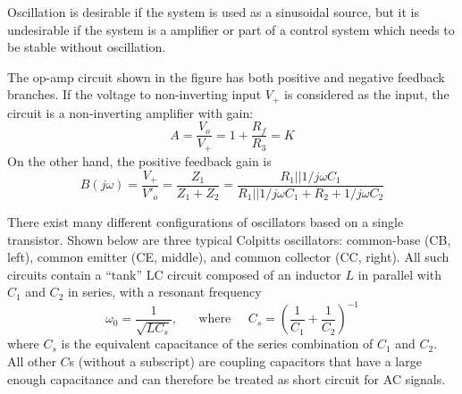 Oscillation is desirable if the system is used as a sinusoidal source, 
but it is undesirable if the system is a amplifier or part of a
control system which needs to be stable without oscillation.




The op-amp circuit shown in the figure has both positive and negative
feedback branches. If the voltage to non-inverting input $V_+$ is 
considered as the input, the circuit is a non-inverting amplifier 
with gain:
\[
A=\frac{V_o}{V_+}=1+\frac{R_f}{R_3}=K
\]
On the other hand, the positive feedback gain is
\[
B(j\omega)=\frac{V_+}{V'_o}=\frac{Z_1}{Z_1+Z_2}
=\frac{R_1||1/j\omega C_1}{R_1||1/j\omega C_1+R_2+1/j\omega C_2}
\]

There exist many different configurations of oscillators based on a
single transistor. Shown below are three typical Colpitts oscillators:
common-base (CB, left), common emitter (CE, middle), and common 
collector (CC, right). All such circuits contain a ``tank'' LC circuit
composed of an inductor $L$ in parallel with $C_1$ and $C_2$ in series, 
with a resonant frequency 
\[
\omega_0=\frac{1}{\sqrt{LC_s}},\;\;\;\;\;\;\mbox{where}\;\;\;\;\;
C_s=\left(\frac{1}{C_1}+\frac{1}{C_2}\right)^{-1}
\]
where $C_s$ is the equivalent capacitance of the series combination 
of $C_1$ and $C_2$. All other $C$s (without a subscript) are coupling
capacitors that have a large enough capacitance and can therefore be 
treated as short circuit for AC signals. 


